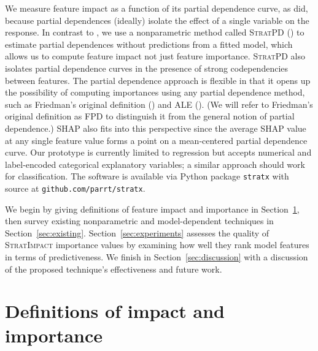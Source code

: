 \documentclass[11pt]{article}
\newcommand{\secref}[1]{Section~\ref{#1}}
\newcommand{\cut}[1]{}
\newcommand{\simp}{\fontfamily{cmr}\textsc{\small StratImpact}}
\newcommand{\spd}{\fontfamily{cmr}\textsc{\small StratPD}}
\begin{document}
We measure feature impact as a function of its partial dependence curve, as \cite{pdvim} did, because partial dependences (ideally) isolate the effect of a single variable on the response. In contrast to \cite{pdvim}, we use a nonparametric method called \spd{} (\citealt{stratpd}) to estimate partial dependences without predictions from a fitted model, which allows us to compute feature impact not just feature importance. \spd{} also isolates partial dependence curves in the presence of strong codependencies between features. The partial dependence approach is flexible in that it opens up the possibility of computing importances using any partial dependence method, such as Friedman's original definition (\citealt{PDP}) and ALE (\citealt{ALE}). (We will refer to Friedman's original definition as FPD to distinguish it from the general notion of partial dependence.) SHAP also fits into this perspective since the average SHAP value at any single feature value forms a point on a mean-centered partial dependence curve. Our prototype is currently limited to regression but accepts numerical and label-encoded categorical explanatory variables; a similar approach should work for classification. The software is available via Python package {\tt stratx} with source at {\tt github.com/parrt/stratx}. 

We begin by giving definitions of feature impact and importance in \secref{sec:def}, then survey existing nonparametric and model-dependent techniques in \secref{sec:existing}. \secref{sec:experiments} assesses the quality of \simp{} importance values by examining how well they rank model features in terms of predictiveness. We finish in \secref{sec:discussion} with a discussion of the proposed technique's effectiveness and future work.

\section{Definitions of impact and importance}\label{sec:def}

\cut{Practitioners loosely define feature importance as feature predictiveness, which presupposes a fitted predictive model, probably because importances are so often used for feature selection during model development.  Research  focuses on more accurately identifying the impact of features upon model predictions.  But, relying on a fitted model makes it difficult to tease apart the true feature importance from the ability of the model to exploit that feature for prediction purposes. Rather than measuring feature impact on {\em model predictions}, we propose avoiding the model completely to define feature importance as the average impact of a feature on the {\em data set response values}.}
\end{document}
